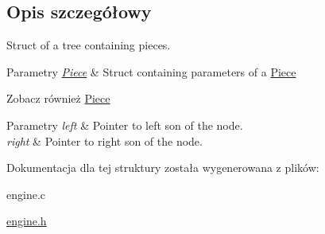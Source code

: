 \subsection{Opis szczegółowy}
Struct of a tree containing pieces. 


\begin{DoxyParams}{Parametry}
{\em \hyperlink{structPiece}{Piece}} & Struct containing parameters of a \hyperlink{structPiece}{Piece} \\
\hline
\end{DoxyParams}
\begin{DoxySeeAlso}{Zobacz również}
\hyperlink{structPiece}{Piece} 
\end{DoxySeeAlso}

\begin{DoxyParams}{Parametry}
{\em left} & Pointer to left son of the node. \\
\hline
{\em right} & Pointer to right son of the node. \\
\hline
\end{DoxyParams}


Dokumentacja dla tej struktury została wygenerowana z plików\-:\begin{DoxyCompactItemize}
\item 
engine.\-c\item 
\hyperlink{engine_8h}{engine.\-h}\end{DoxyCompactItemize}
